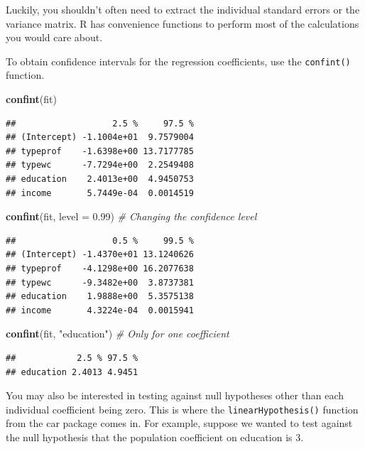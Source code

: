 \documentclass[12pt,oneside,openany]{book}
\newenvironment{Shaded}{\begin{snugshade}}{\end{snugshade}}
\newcommand{\KeywordTok}[1]{\textcolor[rgb]{0.13,0.29,0.53}{\textbf{{#1}}}}
\newcommand{\DataTypeTok}[1]{\textcolor[rgb]{0.13,0.29,0.53}{{#1}}}
\newcommand{\FloatTok}[1]{\textcolor[rgb]{0.00,0.00,0.81}{{#1}}}
\newcommand{\StringTok}[1]{\textcolor[rgb]{0.31,0.60,0.02}{{#1}}}
\newcommand{\CommentTok}[1]{\textcolor[rgb]{0.56,0.35,0.01}{\textit{{#1}}}}
\newcommand{\NormalTok}[1]{{#1}}
\begin{document}
Luckily, you shouldn't often need to extract the individual standard
errors or the variance matrix. R has convenience functions to perform
most of the calculations you would care about.

To obtain confidence intervals for the regression coefficients, use the
\texttt{confint()} function.

\begin{Shaded}
\begin{Highlighting}[]
\KeywordTok{confint}\NormalTok{(fit)}
\end{Highlighting}
\end{Shaded}

\begin{verbatim}
##                   2.5 %     97.5 %
## (Intercept) -1.1004e+01  9.7579004
## typeprof    -1.6398e+00 13.7177785
## typewc      -7.7294e+00  2.2549408
## education    2.4013e+00  4.9450753
## income       5.7449e-04  0.0014519
\end{verbatim}

\begin{Shaded}
\begin{Highlighting}[]
\KeywordTok{confint}\NormalTok{(fit, }\DataTypeTok{level =} \FloatTok{0.99}\NormalTok{)  }\CommentTok{# Changing the confidence level}
\end{Highlighting}
\end{Shaded}

\begin{verbatim}
##                   0.5 %     99.5 %
## (Intercept) -1.4370e+01 13.1240626
## typeprof    -4.1298e+00 16.2077638
## typewc      -9.3482e+00  3.8737381
## education    1.9888e+00  5.3575138
## income       4.3224e-04  0.0015941
\end{verbatim}

\begin{Shaded}
\begin{Highlighting}[]
\KeywordTok{confint}\NormalTok{(fit, }\StringTok{"education"}\NormalTok{)   }\CommentTok{# Only for one coefficient}
\end{Highlighting}
\end{Shaded}

\begin{verbatim}
##            2.5 % 97.5 %
## education 2.4013 4.9451
\end{verbatim}

You may also be interested in testing against null hypotheses other than
each individual coefficient being zero. This is where the
\texttt{linearHypothesis()} function from the car package comes in. For
example, suppose we wanted to test against the null hypothesis that the
population coefficient on education is 3.
\end{document}
